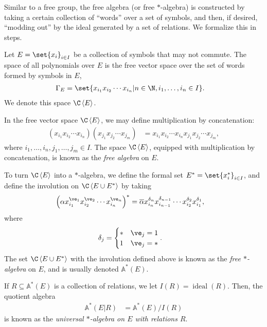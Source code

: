 Similar to a free group, the free algebra (or free $\ast$-algebra) is constructed by taking a certain collection of ``words'' over a set of symbols, and then, if desired, ``modding out'' by the ideal generated by a set of relations. We formalize this in steps.
\begin{definition}
  Let $E=\set{x_i}_{i\in I}$ be a collection of symbols that may not commute. The space of all polynomials over $E$ is the free vector space over the set of words formed by symbols in $E$,
  \begin{align*}
    \Gamma_E &= \set{x_{i_1}x_{i_2}\cdots x_{i_n} | n\in\N,i_1,\dots,i_n\in I}.
  \end{align*}
  We denote this space $\C \left\langle E \right\rangle$.\newline

  In the free vector space $\C \left\langle E \right\rangle$, we may define multiplication by concatenation:
  \begin{align*}
    \left(x_{i_1}x_{i_2}\cdots x_{i_n}\right)\left(x_{j_1}x_{j_2}\cdots x_{j_m}\right) &= x_{i_1}x_{i_2}\cdots x_{i_n}x_{j_1}x_{j_2}\cdots x_{j_m},
  \end{align*}
  where $i_1,\dots,i_n,j_1,\dots,j_m\in I$. The space $\C\left\langle E \right\rangle$, equipped with multiplication by concatenation, is known as the \textit{free algebra} on $E$.\newline

  To turn $\C\left\langle E \right\rangle$ into a $\ast$-algebra, we define the formal set $E^{\ast} = \set{x_{i}^{\ast}}_{i\in I}$, and define the involution on $\C\left\langle E\cup E^{\ast} \right\rangle$ by taking
  \begin{align*}
    \left(\alpha x_{i_1}^{\ve_1}x_{i_2}^{\ve_2}\cdots x_{i_n}^{\ve_n}\right)^{\ast} &= \overline{\alpha}x_{i_n}^{\delta_n}x_{i_{n-1}}^{\delta_{n-1}}\cdots x_{i_2}^{\delta_2}x_{i_1}^{\delta_1},
  \end{align*}
  where
  \begin{align*}
    \delta_j &= \begin{cases}
      \ast & \ve_j = 1\\
      1 & \ve_j = \ast
    \end{cases}.
  \end{align*}
  The set $\C\left\langle E\cup E^{\ast} \right\rangle$ with the involution defined above is known as the \textit{free $\ast$-algebra} on $E$, and is usually denoted $\mathbb{A}^{\ast}\left(E\right)$.\newline

  If $R\subseteq \mathbb{A}^{\ast}\left(E\right)$ is a collection of relations, we let $I(R) = \operatorname{ideal}\left(R\right)$. Then, the quotient algebra
  \begin{align*}
    \mathbb{A}^{\ast}\left(E|R\right) &= \mathbb{A}^{\ast}\left(E\right)/I(R)
  \end{align*}
  is known as the \textit{universal $\ast$-algebra on $E$ with relations $R$}.
\end{definition}
